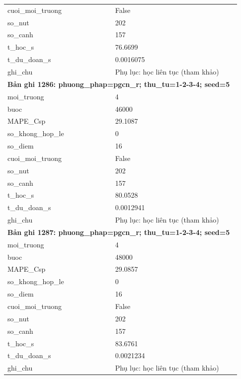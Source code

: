 \begin{longtable}{p{0.43\linewidth}p{0.50\linewidth}}
cuoi\_\allowbreak moi\_\allowbreak truong & False \\
so\_\allowbreak nut & 202 \\
so\_\allowbreak canh & 157 \\
t\_\allowbreak hoc\_\allowbreak s & 76.6699 \\
t\_\allowbreak du\_\allowbreak doan\_\allowbreak s & 0.0016075 \\
ghi\_\allowbreak chu & Phụ lục: học liên tục (tham khảo) \\
\midrule
\multicolumn{2}{p{0.95\linewidth}}{\textbf{Bản ghi 1286: phuong\_phap=pgcn\_r; thu\_tu=1-2-3-4; seed=5}} \\
moi\_\allowbreak truong & 4 \\
buoc & 46000 \\
MAPE\_\allowbreak Csp & 29.1087 \\
so\_\allowbreak khong\_\allowbreak hop\_\allowbreak le & 0 \\
so\_\allowbreak diem & 16 \\
cuoi\_\allowbreak moi\_\allowbreak truong & False \\
so\_\allowbreak nut & 202 \\
so\_\allowbreak canh & 157 \\
t\_\allowbreak hoc\_\allowbreak s & 80.0528 \\
t\_\allowbreak du\_\allowbreak doan\_\allowbreak s & 0.0012941 \\
ghi\_\allowbreak chu & Phụ lục: học liên tục (tham khảo) \\
\midrule
\multicolumn{2}{p{0.95\linewidth}}{\textbf{Bản ghi 1287: phuong\_phap=pgcn\_r; thu\_tu=1-2-3-4; seed=5}} \\
moi\_\allowbreak truong & 4 \\
buoc & 48000 \\
MAPE\_\allowbreak Csp & 29.0857 \\
so\_\allowbreak khong\_\allowbreak hop\_\allowbreak le & 0 \\
so\_\allowbreak diem & 16 \\
cuoi\_\allowbreak moi\_\allowbreak truong & False \\
so\_\allowbreak nut & 202 \\
so\_\allowbreak canh & 157 \\
t\_\allowbreak hoc\_\allowbreak s & 83.6761 \\
t\_\allowbreak du\_\allowbreak doan\_\allowbreak s & 0.0021234 \\
ghi\_\allowbreak chu & Phụ lục: học liên tục (tham khảo) \\

\end{longtable}
